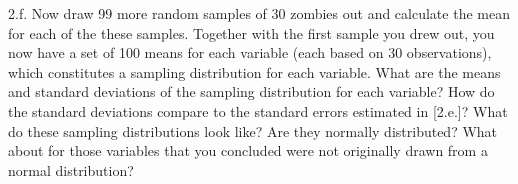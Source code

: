 \documentclass[]{article}
\newenvironment{Shaded}{\begin{snugshade}}{\end{snugshade}}
\newcommand{\KeywordTok}[1]{\textcolor[rgb]{0.13,0.29,0.53}{\textbf{#1}}}
\newcommand{\DataTypeTok}[1]{\textcolor[rgb]{0.13,0.29,0.53}{#1}}
\newcommand{\DecValTok}[1]{\textcolor[rgb]{0.00,0.00,0.81}{#1}}
\newcommand{\StringTok}[1]{\textcolor[rgb]{0.31,0.60,0.02}{#1}}
\newcommand{\CommentTok}[1]{\textcolor[rgb]{0.56,0.35,0.01}{\textit{#1}}}
\newcommand{\OtherTok}[1]{\textcolor[rgb]{0.56,0.35,0.01}{#1}}
\newcommand{\ControlFlowTok}[1]{\textcolor[rgb]{0.13,0.29,0.53}{\textbf{#1}}}
\newcommand{\OperatorTok}[1]{\textcolor[rgb]{0.81,0.36,0.00}{\textbf{#1}}}
\newcommand{\NormalTok}[1]{#1}
\begin{document}
2.f. Now draw 99 more random samples of 30 zombies out and calculate the
mean for each of the these samples. Together with the first sample you
drew out, you now have a set of 100 means for each variable (each based
on 30 observations), which constitutes a sampling distribution for each
variable. What are the means and standard deviations of the sampling
distribution for each variable? How do the standard deviations compare
to the standard errors estimated in {[}2.e.{]}? What do these sampling
distributions look like? Are they normally distributed? What about for
those variables that you concluded were not originally drawn from a
normal distribution?

\begin{Shaded}
\end{Shaded}
\end{document}
